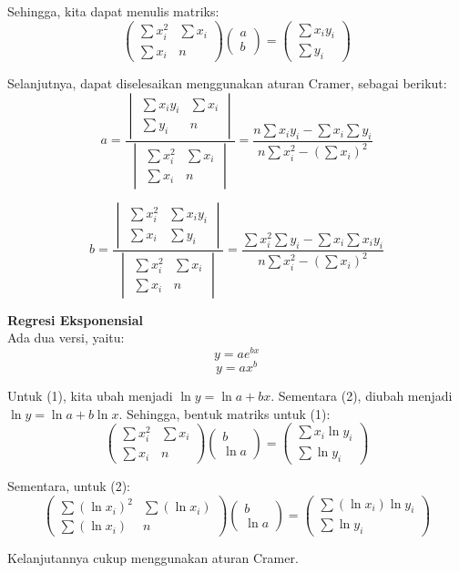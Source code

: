 \documentclass[a4paper,extrafontsizes, 9pt]{memoir}
\begin{document}
\begin{multicols}{3}
Sehingga, kita dapat menulis matriks:
\[
\begin{pmatrix}
\sum x_i^2 & \sum x_i \\
\sum x_i & n
\end{pmatrix}
\begin{pmatrix}
a \\
b
\end{pmatrix}
=
\begin{pmatrix}
\sum x_i y_i \\
\sum y_i
\end{pmatrix}
\]

Selanjutnya, dapat diselesaikan menggunakan aturan Cramer, sebagai berikut:
\[
a =
\frac{
\begin{vmatrix}
\sum x_i y_i & \sum x_i \\
\sum y_i & n
\end{vmatrix}
}{
\begin{vmatrix}
\sum x_i^2 & \sum x_i \\
\sum x_i & n
\end{vmatrix}
}
=
\frac{n \sum x_i y_i - \sum x_i \sum y_i}{n \sum x_i^2 - (\sum x_i)^2}
\]

\[
b =
\frac{
\begin{vmatrix}
\sum x_i^2 & \sum x_i y_i \\
\sum x_i & \sum y_i
\end{vmatrix}
}{
\begin{vmatrix}
\sum x_i^2 & \sum x_i \\
\sum x_i & n
\end{vmatrix}
}
=
\frac{\sum x_i^2 \sum y_i - \sum x_i \sum x_i y_i}{n \sum x_i^2 - (\sum x_i)^2}
\]

\textbf{Regresi Eksponensial}\\
Ada dua versi, yaitu:
\[
y = ae^{bx} \tag{1}
\]
\[
y = ax^b \tag{2}
\]

Untuk (1), kita ubah menjadi $\ln y = \ln a + bx$. Sementara (2), diubah menjadi $\ln y = \ln a + b \ln x$. Sehingga, bentuk matriks untuk (1):
\[
\begin{pmatrix}
\sum x_i^2 & \sum x_i \\
\sum x_i & n
\end{pmatrix}
\begin{pmatrix}
b \\
\ln a
\end{pmatrix}
=
\begin{pmatrix}
\sum x_i \ln y_i \\
\sum \ln y_i
\end{pmatrix}
\]

Sementara, untuk (2):
\[
\begin{pmatrix}
\sum (\ln x_i)^2 & \sum (\ln x_i) \\
\sum (\ln x_i) & n
\end{pmatrix}
\begin{pmatrix}
b \\
\ln a
\end{pmatrix}
=
\begin{pmatrix}
\sum (\ln x_i) \ln y_i \\
\sum \ln y_i
\end{pmatrix}
\]

Kelanjutannya cukup menggunakan aturan Cramer.

   \end{multicols}
\end{document}

